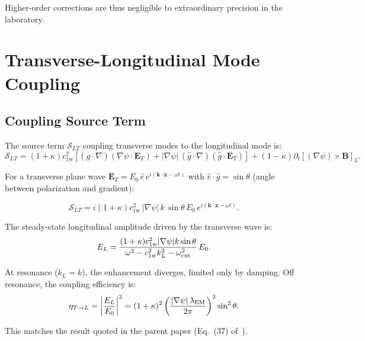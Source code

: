 \documentclass[aps,prd,twocolumn,superscriptaddress,nofootinbib,floatfix]{revtex4-2}
\newcommand{\cfield}{c_{\text{1w}}}
\newcommand{\xvec}{\mathbf{x}}
\newcommand{\kvec}{\mathbf{k}}
\newcommand{\Evec}{\mathbf{E}}
\newcommand{\Bvec}{\mathbf{B}}
\newcommand{\calS}{\mathcal{S}}
\begin{document}
Higher-order corrections are thus negligible to extraordinary
precision in the laboratory.

\section{Transverse-Longitudinal Mode Coupling}
\label{sec:TL-coupling}

\subsection{Coupling Source Term}

The source term $\calS_{LT}$ coupling transverse modes to the
longitudinal mode is:
\begin{equation}
\calS_{LT} = (1+\kappa)\cfield^2\left[
(\hat{g}\cdot\nabla)(\nabla\psi\cdot\Evec_T)
+ |\nabla\psi|\,(\hat{g}\cdot\nabla)(\hat{g}\cdot\Evec_T)
\right] + (1-\kappa)\partial_t[(\nabla\psi)\times\Bvec]_L.
\label{eq:source-exact}
\end{equation}

For a transverse plane wave
$\Evec_T = E_0\,\hat{e}\,e^{i(\kvec\cdot\xvec - \omega t)}$
with $\hat{e}\cdot\hat{g} = \sin\theta$ (angle between polarization
and gradient):

\begin{equation}
\calS_{LT} = i(1+\kappa)\cfield^2\,|\nabla\psi|\,k\,\sin\theta\,E_0\,e^{i(\kvec\cdot\xvec-\omega t)}.
\end{equation}

The steady-state longitudinal amplitude driven by the transverse
wave is:
\begin{equation}
E_L = \frac{(1+\kappa)\cfield^2|\nabla\psi| k\sin\theta}
{\omega^2 - \cfield^2 k_L^2 - \omega_{\rm cut}^2}\,E_0.
\end{equation}

At resonance ($k_L = k$), the enhancement diverges, limited
only by damping.  Off resonance, the coupling efficiency is:
\begin{equation}
\eta_{T\to L} = \left|\frac{E_L}{E_0}\right|^2
= (1+\kappa)^2\left(\frac{|\nabla\psi|\,\lambda_{\rm EM}}{2\pi}\right)^2\sin^2\theta.
\label{eq:coupling-eff}
\end{equation}

This matches the result quoted in the parent paper (Eq.~(37)
of~\cite{Alcock2025P14}).
\end{document}
